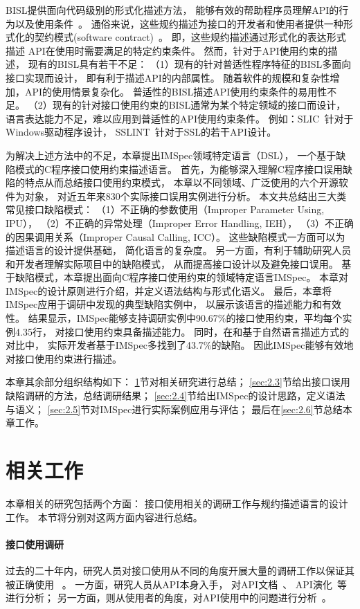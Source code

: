 BISL提供面向代码级别的形式化描述方法，
能够有效的帮助程序员理解API的行为以及使用条件~\cite{survey12}。
通俗来说，这些规约描述为接口的开发者和使用者提供一种形式化的契约模式(software contract)~\cite{92-ieee-contract}。
即，这些规约描述通过形式化的表达形式描述
API在使用时需要满足的特定约束条件。
然而，针对于API使用约束的描述，
现有的BISL具有若干不足：
（1）现有的针对普适性程序特征的BISL多面向接口实现而设计，
即有利于描述API的内部属性。
随着软件的规模和复杂性增加，API的使用情景复杂化。
普适性的BISL描述API使用约束条件的易用性不足。
（2）现有的针对接口使用约束的BISL通常为某个特定领域的接口而设计，
语言表达能力不足，难以应用到普适性的API使用约束条件。
例如：SLIC~\cite{01-slic}针对于Windows驱动程序设计，
SSLINT~\cite{15-sp-sslint}针对于SSL的若干API设计。


为解决上述方法中的不足，本章提出IMSpec领域特定语言（DSL），
一个基于缺陷模式的C程序接口使用约束描述语言。
首先，为能够深入理解C程序接口误用缺陷的特点从而总结接口使用约束模式，
本章以不同领域、广泛使用的六个开源软件为对象，
对近五年来830个实际接口误用实例进行分析。
本文共总结出三大类常见接口缺陷模式：
（1）不正确的参数使用（Improper Parameter Using, IPU），
（2）不正确的异常处理（Improper Error Handling, IEH），
（3）不正确的因果调用关系（Improper Causal Calling, ICC）。
这些缺陷模式一方面可以为描述语言的设计提供基础，
简化语言的复杂度。
另一方面，有利于辅助研究人员和开发者理解实际项目中的缺陷模式，
从而提高接口设计以及避免接口误用。
基于缺陷模式，本章提出面向C程序接口使用约束的领域特定语言IMSpec。
本章对IMSpec的设计原则进行介绍，并定义语法结构与形式化语义。
最后，本章将IMSpec应用于调研中发现的典型缺陷实例中，
以展示该语言的描述能力和有效性。
结果显示，IMSpec能够支持调研实例中90.67\%的接口使用约束，平均每个实例4.35行，
对接口使用约束具备描述能力。
同时，在和基于自然语言描述方式的对比中，
实际开发者基于IMSpec多找到了43.7\%的缺陷。
因此IMSpec能够有效地对接口使用约束进行描述。


本章其余部分组织结构如下：
\ref{sec:2.2}节对相关研究进行总结；
\ref{sec:2.3}节给出接口误用缺陷调研的方法，总结调研结果；
\ref{sec:2.4}节给出IMSpec的设计思路，定义语法与语义；
\ref{sec:2.5}节对IMSpec进行实际案例应用与评估；
最后在\ref{sec:2.6}节总结本章工作。

\section{相关工作}
\label{sec:2.2}
本章相关的研究包括两个方面：
接口使用相关的调研工作与规约描述语言的设计工作。
本节将分别对这两方面内容进行总结。

\paragraph{接口使用调研}
过去的二十年内，研究人员对接口使用从不同的角度开展大量的调研工作以保证其被正确使用
~\cite{16-icse-cry,17-tse-survey, 12-fse-parallel,12-fse-deprecation,	18-sqj-evolution,11-etaps-doc, 15-ese-evolution, 11-ese-learning, 15-tse-change,13-etaps-mapping}。
一方面，研究人员从API本身入手，
对API文档~\cite{12-fse-deprecation, 18-sqj-evolution,11-etaps-doc}、
API演化~\cite{15-ese-evolution,15-tse-change}等进行分析；
另一方面，则从使用者的角度，对API使用中的问题进行分析~\cite{16-icse-cry,17-tse-survey,12-fse-parallel,11-ese-learning,13-etaps-mapping}。

